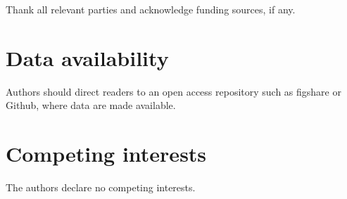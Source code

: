 \documentclass[opinion,breakmath]{seismica}
\begin{document}
\begin{acknowledgements}
	Thank all relevant parties and acknowledge funding sources, if any.
\end{acknowledgements}
	
\section*{Data availability}
Authors should direct readers to an open access repository such as figshare or Github, where data are made available.

\section*{Competing interests}
The authors declare no competing interests.

 
	
\end{document}
